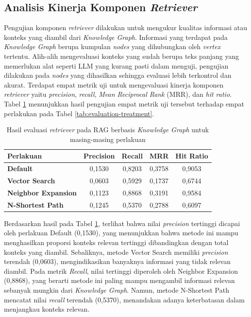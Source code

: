 \subsection{Analisis Kinerja Komponen \textit{Retriever}}

Pengujian komponen \textit{retriever} dilakukan untuk mengukur kualitas informasi atau konteks yang diambil dari \textit{Knowledge Graph}.
Informasi yang terdapat pada \textit{Knowledge Graph} berupa kumpulan \textit{nodes} yang dihubungkan oleh \textit{vertex} tertentu.
Alih-alih mengevaluasi konteks yang sudah berupa teks panjang yang memerlukan alat seperti LLM yang kurang pasti dalam menguji, pengujian dilakukan pada \textit{nodes} yang dihasilkan sehingga evaluasi lebih terkontrol dan akurat.
Terdapat empat metrik uji untuk mengevaluasi kinerja komponen \textit{retriever} yaitu \textit{precision}, \textit{recall}, \textit{Mean Reciprocal Rank} (MRR), dan \textit{hit ratio}.
Tabel \ref{tab:retrieval-evaluation-result} menunjukkan hasil pengujian empat metrik uji tersebut terhadap empat perlakukan pada Tabel \ref{tab:evaluation-treatment}.

\begin{table}[H]
	\centering
	\caption{Hasil evaluasi \textit{retriever} pada RAG berbasis \textit{Knowledge Graph} untuk masing-masing perlakuan}
	\label{tab:retrieval-evaluation-result}
	\begin{tabular}{|l|c|c|c|c|}
		\hline
		\textbf{Perlakuan}          & \textbf{Precision} & \textbf{Recall} & \textbf{MRR} & \textbf{Hit Ratio} \\
		\hline \hline
		\textbf{Default}            & 0,1530             & 0,8203          & 0,3758       & 0,9053             \\
		\hline
		\textbf{Vector Search}      & 0,0603             & 0,5929          & 0,1737       & 0,6744             \\
		\hline
		\textbf{Neighbor Expansion} & 0,1123             & 0,8868          & 0,3191       & 0,9584             \\
		\hline
		\textbf{N-Shortest Path}    & 0,1245             & 0,5370          & 0,2788       & 0,6097             \\
		\hline
	\end{tabular}
\end{table}

Berdasarkan hasil pada Tabel \ref{tab:retrieval-evaluation-result}, terlihat bahwa nilai \textit{precision} tertinggi dicapai oleh perlakuan Default (0,1530), yang menunjukkan bahwa metode ini mampu menghasilkan proporsi konteks relevan tertinggi dibandingkan dengan total konteks yang diambil.
Sebaliknya, metode Vector Search memiliki \textit{precision} terendah (0,0603), mengindikasikan banyaknya informasi yang tidak relevan diambil.
Pada metrik \textit{Recall}, nilai tertinggi diperoleh oleh Neighbor Expansion (0,8868), yang berarti metode ini paling mampu mengambil informasi relevan sebanyak mungkin dari \textit{Knowledge Graph}.
Namun, metode N-Shortest Path mencatat nilai \textit{recall} terendah (0,5370), menandakan adanya keterbatasan dalam menjangkau konteks relevan.

